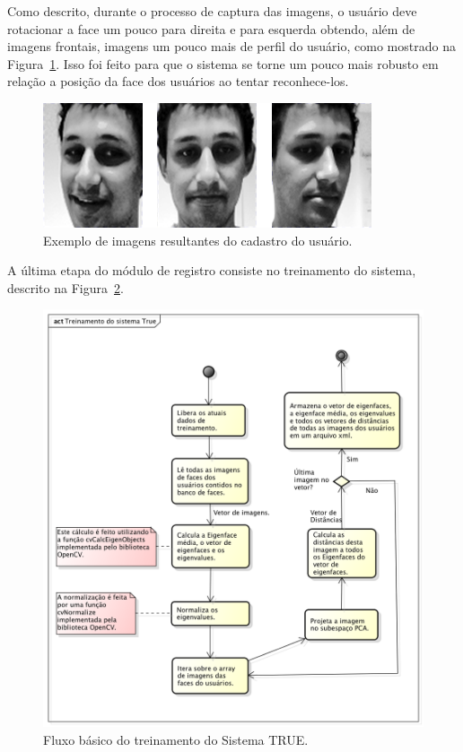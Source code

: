 	Como descrito, durante o processo de captura das imagens, o usuário deve rotacionar a face um pouco para direita e para esquerda obtendo, além de imagens frontais, imagens um pouco mais de perfil do usuário, como mostrado na Figura~\ref{fig:imgs-cadastro}. Isso foi feito para que o sistema se torne um pouco mais robusto em relação a posição da face dos usuários ao tentar reconhece-los.

		\begin{figure}[H]
			\begin{center}
				\includegraphics[scale=0.4]{figuras/4.ProblemaEProposta/face-registro.png}
			\end{center}
			\caption{Exemplo de imagens resultantes do cadastro do usuário.}
			\label{fig:imgs-cadastro}
		\end{figure}	

	A última etapa do módulo de registro consiste no treinamento do sistema, descrito na Figura~\ref{fig:treinamento}.

		\begin{figure}[hbt]
			\begin{center}
				\includegraphics[scale=0.7]{figuras/4.ProblemaEProposta/diagrama-registro.png}
			\end{center}
			\caption{Fluxo básico do treinamento do Sistema TRUE.}
			\label{fig:treinamento}
		\end{figure}	